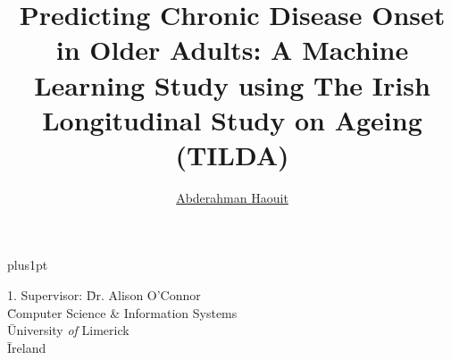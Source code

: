 \documentclass[twoside,12pt, openany]{Latex/Classes/PhDthesisPSnPDF}
\title{Predicting Chronic Disease Onset in Older Adults: A Machine Learning Study using The Irish Longitudinal Study on Ageing (TILDA)}
\author{\href{mailto: 24474983@studentmail.ul.ie}{Abderahman Haouit}}
\begin{document}





\renewcommand\baselinestretch{1.2}
\baselineskip=18pt plus1pt



\maketitle  %





 \begin{tabbing}
1.  Supervisor: \= Dr. Alison O'Connor    \\
 \>  \= Computer Science \& Information Systems\\
 \>  \= University \emph{of} Limerick \\
 \>  \= Ireland \\
 \end{tabbing}









\frontmatter



% 


\setcounter{secnumdepth}{3} %
\setcounter{tocdepth}{3}    %
\tableofcontents            %
\end{document}
